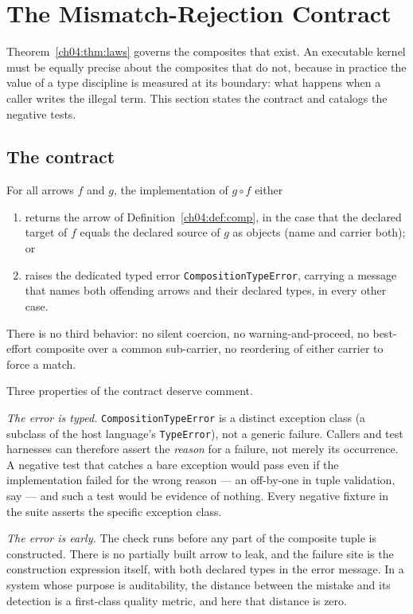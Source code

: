 \section{The Mismatch-Rejection Contract}
\label{ch04:sec:contract}

Theorem~\ref{ch04:thm:laws} governs the composites that exist. An executable
kernel must be equally precise about the composites that do not, because in
practice the value of a type discipline is measured at its boundary: what
happens when a caller writes the illegal term. This section states the
contract and catalogs the negative tests.

\subsection{The contract}

\begin{invariant}
\label{ch04:inv:mismatch}
For all arrows $f$ and $g$, the implementation of $g \circ f$ either
\begin{enumerate}
\item returns the arrow of Definition~\ref{ch04:def:comp}, in the case that
the declared target of $f$ equals the declared source of $g$ as objects
(name and carrier both); or
\item raises the dedicated typed error \texttt{CompositionTypeError},
carrying a message that names both offending arrows and their declared
types, in every other case.
\end{enumerate}
There is no third behavior: no silent coercion, no warning-and-proceed, no
best-effort composite over a common sub-carrier, no reordering of either
carrier to force a match.
\end{invariant}

Three properties of the contract deserve comment.

\emph{The error is typed.} \texttt{CompositionTypeError} is a distinct
exception class (a subclass of the host language's \texttt{TypeError}), not
a generic failure. Callers and test harnesses can therefore assert the
\emph{reason} for a failure, not merely its occurrence. A negative test that
catches a bare exception would pass even if the implementation failed for
the wrong reason --- an off-by-one in tuple validation, say --- and such a
test would be evidence of nothing. Every negative fixture in the suite
asserts the specific exception class.

\emph{The error is early.} The check runs before any part of the composite
tuple is constructed. There is no partially built arrow to leak, and the
failure site is the construction expression itself, with both declared types
in the error message. In a system whose purpose is auditability, the
distance between the mistake and its detection is a first-class quality
metric, and here that distance is zero.

